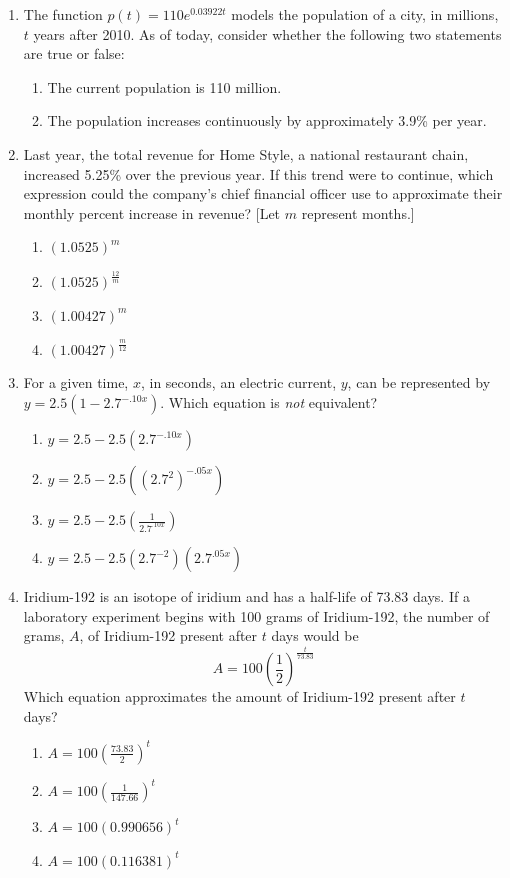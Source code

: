 \documentclass[12pt, oneside]{article}
\begin{document}
\begin{enumerate}
\item The function $p(t)=110e^{0.03922t}$ models the population of a city, in millions, $t$ years after 2010. As of today, consider whether the following two statements are true or false:
\begin{enumerate}
    \item The current population is 110 million.
    \item The population increases continuously by approximately 3.9\% per year.
\end{enumerate} %

\item Last year, the total revenue for Home Style, a national restaurant chain, increased 5.25\% over the previous year. If this trend were to continue, which expression could the company’s chief financial officer use to approximate their monthly percent increase in revenue? [Let $m$ represent months.]
\begin{enumerate}
    \item $(1.0525)^m$
    \item $\displaystyle (1.0525)^{\frac{12}{m}}$
    \item $(1.00427)^m$
    \item $\displaystyle (1.00427)^{\frac{m}{12}}$
\end{enumerate} %

\item For a given time, $x$, in seconds, an electric current, $y$, can be represented by $y = 2.5(1 - 2.7^{-.10x})$. Which equation is \emph{not} equivalent?
\begin{enumerate}
    \item $y = 2.5 - 2.5 (2.7^{-.10x})$
    \item $y = 2.5 - 2.5 ((2.7^2)^{-.05x})$
    \item $\displaystyle y = 2.5 - 2.5 \left( \frac{1}{2.7^{.10x}} \right)$
    \item $y = 2.5 - 2.5 (2.7^{-2})(2.7^{.05x})$
\end{enumerate}

\item Iridium-192 is an isotope of iridium and has a half-life of 73.83 days. If a laboratory experiment begins with 100 grams of Iridium-192, the number of grams, $A$, of Iridium-192 present after $t$ days would be 
\[A=100 \left( \frac{1}{2} \right)^\frac{t}{73.83}\]
Which equation approximates the amount of Iridium-192 present after $t$ days?
\begin{enumerate}
    \item $\displaystyle A=100 \left( \frac{73.83}{2} \right)^t$
    \item $\displaystyle A=100 \left( \frac{1}{147.66} \right)^t$
    \item $A=100  (0.990656)^t$
    \item $A=100 (0.116381)^t$
\end{enumerate}


\end{enumerate}
\end{document}
